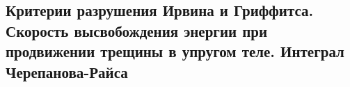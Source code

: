 

\subsection{Критерии разрушения Ирвина и Гриффитса. Скорость высвобождения энергии при продвижении трещины в упругом теле. Интеграл Черепанова-Райса}



